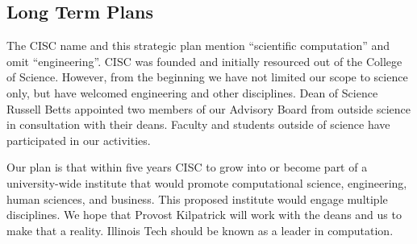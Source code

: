 \documentclass[12pt]{amsart}
\begin{document}
\subsection*{Long Term Plans}
The CISC name and this strategic plan mention ``scientific computation'' and omit ``engineering''.  CISC was founded and initially resourced out of the College of Science.  However, from the beginning we have not limited our scope to science only, but have welcomed engineering and other disciplines.  Dean of Science Russell Betts appointed two members of our Advisory Board from outside science in consultation with their deans.  Faculty and students outside of science have participated in our activities.

Our plan is that within five years CISC to grow into or become part of a university-wide institute that would promote computational science, engineering, human sciences, and business.  This proposed institute would engage multiple disciplines.  We hope that Provost Kilpatrick will work with the deans and us to make that a reality.  Illinois Tech should be known as a leader in computation.
\end{document}
